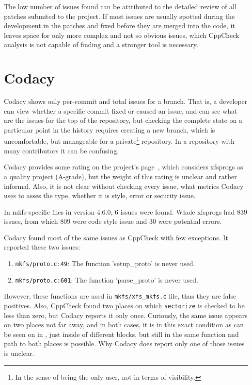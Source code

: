 The low number of issues found can be attributed to the detailed review of all
patches submited to the project. If most issues are usually spotted during the
development in the patches and fixed before they are merged into the code, it
leaves space for only more complex and not so obvious issues, which CppCheck
analysis is not capable of finding and a stronger tool is necessary.

\section{Codacy}\label{chap:results:codacy}
Codacy shows only per-commit and total issues for a branch. That is, a
developer can view whether a specific commit fixed or caused an issue, and
can see what are the issues for the top of the repository, but checking the
complete state on a particular point in the history requires creating a new
branch, which is uncomfortable, but manageable for a private\footnote{In
the sense of being the only user, not in terms of visibility.} repository.
In a repository with many contributors it can be confusing.

Codacy provides some rating on the project's page~\cite{codacyXfsprogs},
which considers xfsprogs as a quality project (A-grade), but the weight of
this rating is unclear and rather informal. Also, it is not clear without
checking every issue, what metrics Codacy uses to asses the type, whether
it is style, error or security issue.

In mkfs-specific files in version 4.6.0, 6 issues were found. Whole
xfsprogs had 839 issues, from which 809 were code style issue and 30 were
potential errors.

Codacy found most of the same issues as CppCheck with few exceptions. It
reported these two issues:
\begin{enumerate}
	\item {\tt mkfs/proto.c:49}: The function 'setup\_proto' is never used.
	\item {\tt mkfs/proto.c:601}: The function 'parse\_proto' is never used.
\end{enumerate}

However, these functions are used in {\tt mkfs/xfs\_mkfs.c} file, thus they are
false positives. Also, CppCheck found two places on which {\tt sectorize} is
checked to be less than zero, but Codacy reports it only once. Curiously, the
same issue appears on two places not far away, and in both cases, it is in this
exact condition as can be seen on  in
, just inside of different blocks, but still in the
same function and path to both places is possible. Why Codacy does report only one of those issues is unclear.


